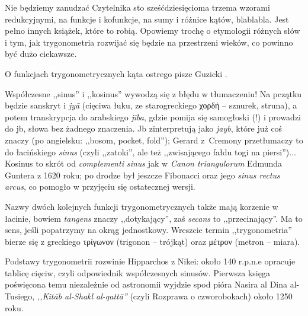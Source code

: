 Nie będziemy zanudzać Czytelnika sto sześćdziesięcioma trzema wzorami redukcyjnymi, na funkcje i kofunkcje, na sumy i różnice kątów, blablabla.
Jest pełno innych książek, które to robią.
Opowiemy trochę o etymologii różnych słów i tym, jak trygonometria rozwijać się będzie na przestrzeni wieków, co powinno być dużo ciekawsze.

O funkcjach trygonometrycznych kąta ostrego pisze Guzicki \cite[s. 240-254]{guzicki_2021}.

Współczesne ,,sinus'' i ,,kosinus'' wywodzą się z błędu w tłumaczeniu!
Na pczątku będzie sanskryt i \emph{jyā} (cięciwa łuku, ze starogreckiego χορδή -- sznurek, struna), a potem transkrypcja do arabskiego \emph{jība}, gdzie pomija się samogłoski (!) i prowadzi do jb, słowa bez żadnego znaczenia. %
Jb zinterpretują jako \emph{jayb}, które już coś znaczy (po angielsku: ,,bosom, pocket, fold''); Gerard z~Cremony przetłumaczy to do łacińskiego \emph{sinus} (czyli ,,zatoki'', ale też ,,zwisającego fałdu togi na piersi'')...
Kosinus to skrót od \emph{complementi sinus} jak w \emph{Canon triangulorum} Edmunda Guntera z 1620 roku; po drodze był jeszcze Fibonacci oraz jego \emph{sinus rectus arcus}, co pomogło w przyjęciu się ostatecznej wersji.

Nazwy dwóch kolejnych funkcji trygonometrycznych także mają korzenie w łacinie, bowiem \emph{tangens} znaczy ,,dotykający'', zaś \emph{secans} to ,,przecinający''.
Ma to sens, jeśli popatrzymy na okrąg jednostkowy.
Wreszcie termin ,,trygonometria'' bierze się z greckiego τρίγωνον (trigonon -- trójkąt) oraz μέτρον (metron -- miara).

Podstawy trygonometrii rozwinie Hipparchos z Nikei: około 140 r.p.n.e opracuje tablicę cięciw, czyli odpowiednik współczesnych sinusów.
Pierwsza księga poświęcona temu niezależnie od astronomii wyjdzie spod pióra Nasira al Dina al-Tusiego, \emph{,,Kitāb al-Shakl al-qattā''} (czyli Rozprawa o czworobokach) około 1250 roku. %

